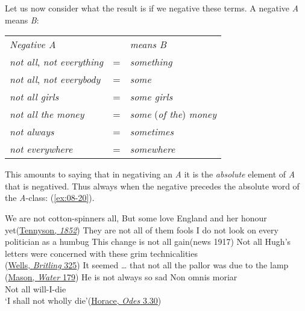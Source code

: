 \label{08-not-all}Let us now consider what the result is if we negative these terms. A negative \textit{A} means \textit{B}:

\begin{table}[H]
\begin{tabular}{l c l}
\emph{Negative A} & & \emph{means B}\\
\textit{not all}, \textit{not everything} & = & \textit{something}\\
\textit{not all}, \textit{not everybody} & = & \textit{some}\\
\textit{not all girls} & = & \textit{some girls}\\
\textit{not all the money} & = & \textit{some} (\textit{of the}) \textit{money}\\
\textit{not always} & = & \textit{sometimes}\\
\textit{not everywhere} & = & \textit{somewhere}\\
\end{tabular}
\end{table}

This amounts to saying that in negativing an \textit{A} it is the \textit{absolute} element of \textit{A} that is negatived. Thus always when the negative precedes the absolute word of the \textit{A}-class: (\ref{ex:08-20}).

\ea \label{ex:08-20}
\ea
We are not cotton-spinners all, But some love England and her honour yet\hfill(\href{https://books.google.st/books?id=TFCjuar4RRYC&pg=PA224&hl=pt-PT&source=gbs_toc_r&cad=2#v=onepage&q&f=false}{Tennyson, \textit{1852}})
\ex
They are not all of them fools
\ex
I do not look on every politician as a humbug
\ex
This change is not all gain\hfill(news 1917)
\ex
Not all Hugh's letters were concerned with these grim technicalities\\\hfill(\href{https://archive.org/details/mrbritlingseesi02unkngoog/page/n344/mode/2up?view=theater&q=%22technicalities%22}{Wells, \textit{Britling} 325}) %
\ex
It seemed {\dots} that not all the pallor was due to the lamp\\\hfill(\href{https://archive.org/details/runningwater00masouoft/page/196/mode/2up?q=%22pallor+was+due+to+the+lamp%22&view=theater}{Mason, \textit{Water} 179}) %
\ex
He is not always so sad
\ex
\gll Non omnis moriar\\
 Not all will-I-die\\
\glt `I shall not wholly die'\hfill(\href{https://archive.org/details/qhoratiflaccica00mlgoog/page/n175/mode/2up?q=%22non+omnis+moriar%22&view=theater}{Horace, \textit{Odes} 3.30}) %
\z
\z


